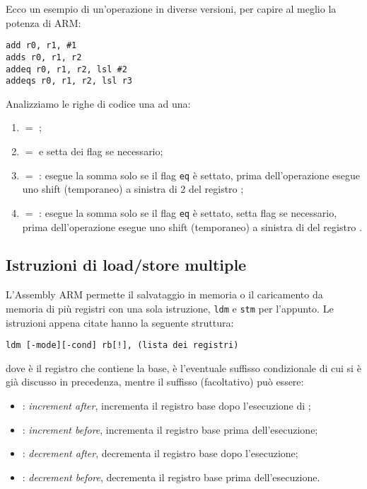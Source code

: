 \documentclass[class=book, crop=false, oneside]{standalone}
\begin{document}
Ecco un esempio di un'operazione in diverse versioni, per capire al meglio la potenza di ARM:
\begin{verbatim}
add r0, r1, #1
adds r0, r1, r2
addeq r0, r1, r2, lsl #2
addeqs r0, r1, r2, lsl r3
\end{verbatim}
Analizziamo le righe di codice una ad una:
\begin{enumerate}
	\item {} \(=\) ;
	\item {} \(=\)  e setta dei flag se necessario;
	\item {} \(=\) : esegue la somma solo se il flag \texttt{eq} è settato, prima dell'operazione esegue uno shift (temporaneo) a sinistra di 2 del registro ;
	\item {} \(=\) : esegue la somma solo se il flag \texttt{eq} è settato, setta flag se necessario, prima dell'operazione esegue uno shift (temporaneo) a sinistra di  del registro .
\end{enumerate}

\subsection*{Istruzioni di load/store multiple}
L'Assembly ARM permette il salvataggio in memoria o il caricamento da memoria di più registri con una sola istruzione, \texttt{ldm} e \texttt{stm} per l'appunto. Le istruzioni appena citate hanno la seguente struttura:
\begin{center}
	\texttt{ldm [-mode][-cond] rb[!], (lista dei registri)}
\end{center}
dove  è il registro che contiene la base,  è l'eventuale suffisso condizionale di cui si è già discusso in precedenza, mentre il suffisso (facoltativo)  può essere:
\begin{itemize}
	\item {}: \emph{increment after}, incrementa il registro base dopo l'esecuzione di ;
	\item {}: \emph{increment before}, incrementa il registro base prima dell'esecuzione;
	\item {}: \emph{decrement after}, decrementa il registro base dopo l'esecuzione;
	\item {}: \emph{decrement before}, decrementa il registro base prima dell'esecuzione.
\end{itemize}
\end{document}
